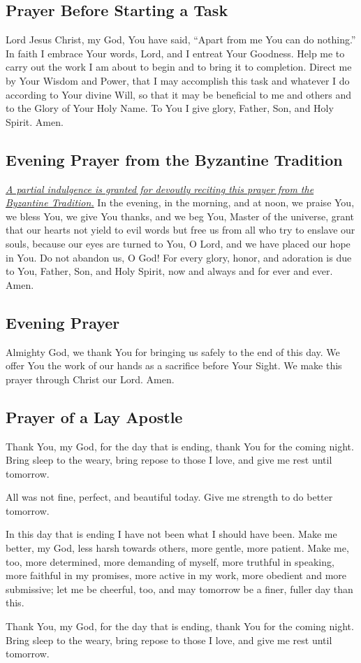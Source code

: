 \documentclass[12pt]{article}
\newcommand{\prayertitle}[1]{\subsection{#1}}
\newcommand{\indulgencedprayertitle}[1]{\prayertitle{#1 \protect\kreuz}}
\newcommand{\emphasis}[1]{\emph{#1}}
\newcommand{\emphasis}[1]{\textsl{#1}}
\newcommand{\note}[1]{{\small{\emphasis{#1}}}\newline}
\newcommand{\linkednote}[2]{\hyperlink{#1}{\note{#2}}}
\begin{document}
\prayertitle{Prayer Before Starting a Task}
Lord Jesus Christ, my God, You have said, ``Apart from me You can do nothing.''
In faith I embrace Your words, Lord, and I entreat Your Goodness.
Help me to carry out the work I am about to begin and to bring it to completion.
Direct me by Your Wisdom and Power, that I may accomplish this task and whatever I do according to Your divine Will, so that it may be beneficial to me and others and to the Glory of Your Holy Name.
To You I give glory, Father, Son, and Holy Spirit.
Amen.

\indulgencedprayertitle{Evening Prayer from the Byzantine Tradition}
\linkednote{grant23}{A partial indulgence is granted for devoutly reciting this prayer from the Byzantine Tradition.}
In the evening, in the morning, and at noon, we praise You, we bless You,
we give You thanks, and we beg You, Master of the universe, grant that our hearts not yield to evil words but free us from all who try to enslave our souls, because our eyes are turned to You, O Lord, and we have placed our hope in You.
Do not abandon us, O God!
For every glory, honor, and adoration is due to You, Father, Son, and Holy Spirit, now and always and for ever and ever.
Amen.

\prayertitle{Evening Prayer}
Almighty God, we thank You for bringing us safely to the end of this day.
We offer You the work of our hands as a sacrifice before Your Sight.
We make this prayer through Christ our Lord.
Amen.

\prayertitle{Prayer of a Lay Apostle}
\label{prayer:lay_apostle}
Thank You, my God, for the day that is ending, thank You for the coming night.
Bring sleep to the weary, bring repose to those I love, and give me rest until tomorrow.

All was not fine, perfect, and beautiful today.
Give me strength to do better tomorrow.

In this day that is ending I have not been what I should have been.
Make me better, my God, less harsh towards others, more gentle, more patient.
Make me, too, more determined, more demanding of myself, more truthful in speaking, more faithful in my promises, more active in my work, more obedient and more submissive;
let me be cheerful, too, and may tomorrow be a finer, fuller day than this.

Thank You, my God, for the day that is ending, thank You for the coming night.
Bring sleep to the weary, bring repose to those I love, and give me rest until tomorrow.
\end{document}
